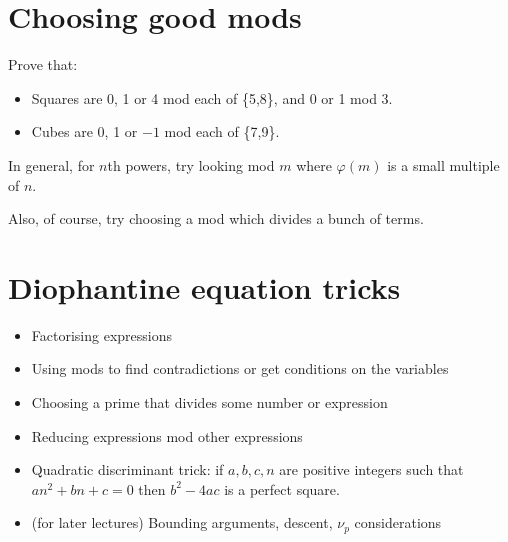 \documentclass{article}
\begin{document}
\section{Choosing good mods}
Prove that:
\begin{itemize}
	\item Squares are 0, 1 or 4 mod each of \{5,8\}, and 0 or 1 mod 3.
	\item Cubes are 0, 1 or $-1$ mod each of \{7,9\}.
\end{itemize}
In general, for $n$th powers, try looking mod $m$ where $\varphi(m)$ is a
small multiple of $n$.

Also, of course, try choosing a mod which divides a bunch of terms.
\section{Diophantine equation tricks}
\begin{itemize}
	\item Factorising expressions
	\item Using mods to find contradictions or get conditions on the variables
	\item Choosing a prime that divides some number or expression
	\item Reducing expressions mod other expressions
	\item Quadratic discriminant trick: if $a,b,c,n$ are positive integers such
	      that $an^2+bn+c=0$ then $b^2-4ac$ is a perfect square.
	\item (for later lectures) Bounding arguments, descent, $\nu_p$
	      considerations
\end{itemize}
\end{document}
